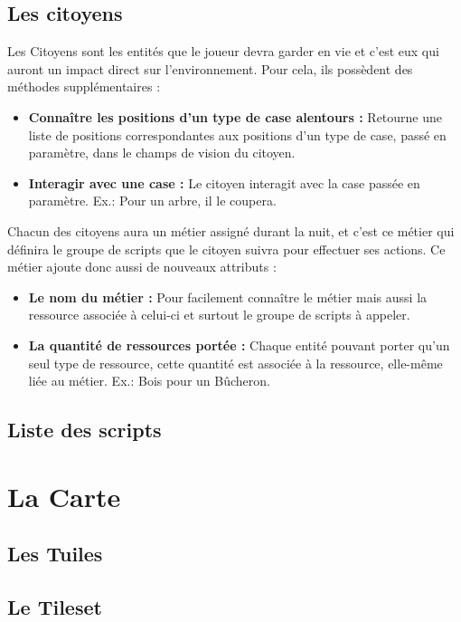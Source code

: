 \documentclass[a4paper]{article}
\newcommand{\alinea}{\hspace*{0.5cm}}
\begin{document}
      \subsection{Les citoyens}
        \alinea Les Citoyens sont les entités que le joueur devra garder en vie et c'est eux qui auront un impact direct sur l'environnement.
        Pour cela, ils possèdent des méthodes supplémentaires :
        \begin{itemize}
          \item \textbf{Connaître les positions d'un type de case alentours : } Retourne une liste de positions correspondantes aux positions d'un type de case, passé en paramètre, dans le champs de vision du citoyen.
          \item \textbf{Interagir avec une case : } Le citoyen interagit avec la case passée en paramètre. Ex.: Pour un arbre, il le coupera.
        \end{itemize}
        \alinea Chacun des citoyens aura un métier assigné durant la nuit, et c'est ce métier qui définira le groupe de scripts que le citoyen suivra pour effectuer ses actions. Ce métier ajoute donc aussi de nouveaux attributs :
        \begin{itemize}
          \item \textbf{Le nom du métier : } Pour facilement connaître le métier mais aussi la ressource associée à celui-ci et surtout le groupe de scripts à appeler.
          \item \textbf{La quantité de ressources portée : } Chaque entité pouvant porter qu'un seul type de ressource, cette quantité est associée à la ressource, elle-même liée au métier. Ex.: Bois pour un Bûcheron.
        \end{itemize}
        
      \subsection{Liste des scripts}
      
    \section{La Carte}
      \subsection{Les Tuiles}
      
      \subsection{Le Tileset}
      
\end{document}
